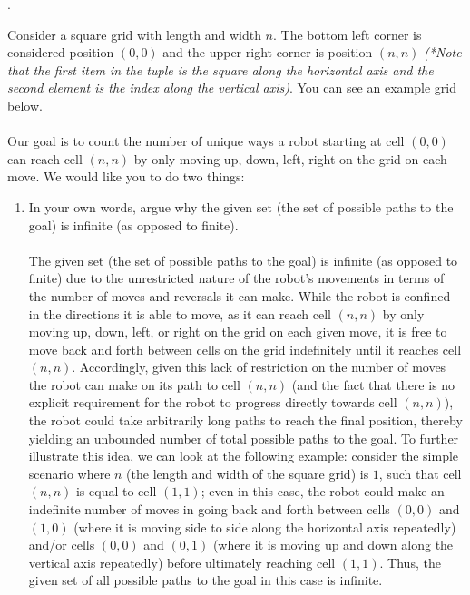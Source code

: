 \documentclass[12pt]{article}
\newcounter{quesnum}
\newcommand{\question}[2][??]{
\begin{list}{\labelitemi}{\leftmargin=2em}
\item [\arabic{quesnum}.] {} {#2}
\end{list}
\addtocounter{quesnum}{1}
}
\begin{document}
\vspace{12pt}



\question[3]{
Consider a square grid with length and width $n$. The bottom left corner is considered position $(0,0)$ and the upper right corner is position $(n,n)$ \emph{(*Note that the first item in the tuple is the square along the horizontal axis and the second element is the index along the vertical axis)}. You can see an example grid below.\\
\\
Our goal is to count the number of unique ways a robot starting at cell $(0,0)$ can reach cell $(n,n)$ by only moving up, down, left, right on the grid on each move. We would like you to do two things:

\begin{enumerate}
	\item In your own words, argue why the given set (the set of possible paths to the goal) is infinite (as opposed to finite).\\
\\
 The given set (the set of possible paths to the goal) is infinite (as opposed to finite) due to the unrestricted nature of the robot's movements in terms of the number of moves and reversals it can make. While the robot is confined in the directions it is able to move, as it can reach cell $(n,n)$ by only moving up, down, left, or right on the grid on each given move, it is free to move back and forth between cells on the grid indefinitely until it reaches cell $(n,n)$. Accordingly, given this lack of restriction on the number of moves the robot can make on its path to cell $(n,n)$ (and the fact that there is no explicit requirement for the robot to progress directly towards cell $(n,n)$), the robot could take arbitrarily long paths to reach the final position, thereby yielding an unbounded number of total possible paths to the goal. To further illustrate this idea, we can look at the following example: consider the simple scenario where $n$ (the length and width of the square grid) is $1$, such that cell $(n,n)$ is equal to cell $(1,1)$; even in this case, the robot could make an indefinite number of moves in going back and forth between cells $(0, 0)$ and $(1, 0)$ (where it is moving side to side along the horizontal axis repeatedly) and/or cells $(0, 0)$ and $(0, 1)$ (where it is moving up and down along the vertical axis repeatedly) before ultimately reaching cell $(1,1)$. Thus, the given set of all possible paths to the goal in this case is infinite.\\
 

\end{enumerate}}
\end{document}
